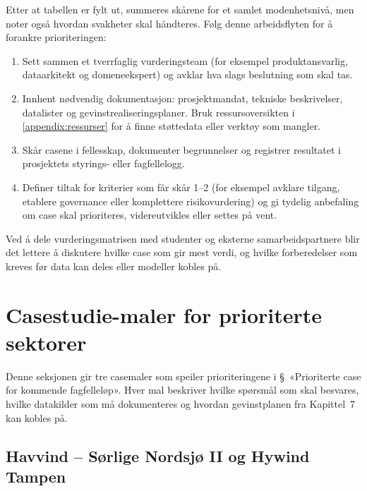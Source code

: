 Etter at tabellen er fylt ut, summeres skårene for et samlet modenhetsnivå, men noter også hvordan svakheter skal håndteres.
Følg denne arbeidsflyten for å forankre prioriteringen:

\begin{enumerate}
    \item Sett sammen et tverrfaglig vurderingsteam (for eksempel produktansvarlig, dataarkitekt og domeneekspert) og avklar
    hva slags beslutning som skal tas.
    \item Innhent nødvendig dokumentasjon: prosjektmandat, tekniske beskrivelser, datalister og gevinstrealiseringsplaner. Bruk
    ressursoversikten i \autoref{appendix:ressurser} for å finne støttedata eller verktøy som mangler.
    \item Skår casene i fellesskap, dokumenter begrunnelser og registrer resultatet i prosjektets styrings- eller fagfellelogg.
    \item Definer tiltak for kriterier som får skår 1--2 (for eksempel avklare tilgang, etablere governance eller komplettere
    risikovurdering) og gi tydelig anbefaling om case skal prioriteres, videreutvikles eller settes på vent.
\end{enumerate}

Ved å dele vurderingsmatrisen med studenter og eksterne samarbeidspartnere blir det lettere å diskutere hvilke case som gir mest
verdi, og hvilke forberedelser som kreves før data kan deles eller modeller kobles på.

\section{Casestudie-maler for prioriterte sektorer}
\label{sec:case-maler-prioriterte-sektorer}
Denne seksjonen gir tre casemaler som speiler prioriteringene i \S~«Prioriterte case for kommende fagfelleløp». Hver mal beskriver hvilke spørsmål som skal besvares, hvilke datakilder som må dokumenteres og hvordan gevinstplanen fra Kapittel~7 kan kobles på.

\subsection{Havvind – Sørlige Nordsjø II og Hywind Tampen}

